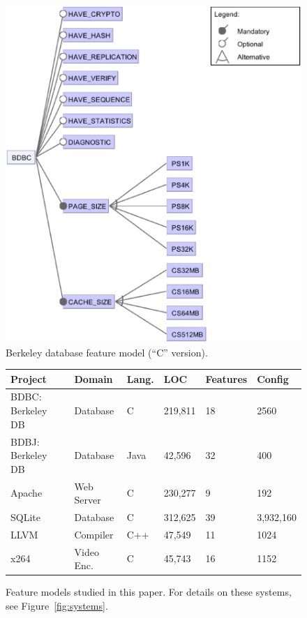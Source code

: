 \documentclass{sig-alternative}
\newcommand{\fig}[1]{Figure~\ref{fig:#1}}
\begin{document}
 
\begin{figure}[!t]
\includegraphics[width=1\linewidth]{Figures/BDBC.eps}
\caption{ Berkeley database feature model   (``C'' version). }\label{fig:bdbc}
\end{figure}
    


\begin{figure}[!t]
\scriptsize
\begin{tabular}{llllll}
  \hline
Project & Domain & Lang. & LOC & Features & Config\\\hline
BDBC: Berkeley DB   & Database & C & 219,811 & 18 & 2560\\
BDBJ: Berkeley DB   & Database & Java & 42,596 & 32  & 400\\
Apache & Web Server & C & 230,277 & 9 & 192\\
SQLite & Database & C & 312,625 & 39 & 3,932,160\\
LLVM & Compiler & C++ & 47,549 & 11 & 1024\\
x264 & Video Enc. & C& 45,743 & 16 & 1152\\\hline
\end{tabular}
\caption{Feature models studied in this paper. For details on these systems,
see \fig{systems}.}
\label{fig:subjectsystems}
\end{figure}
\end{document}
